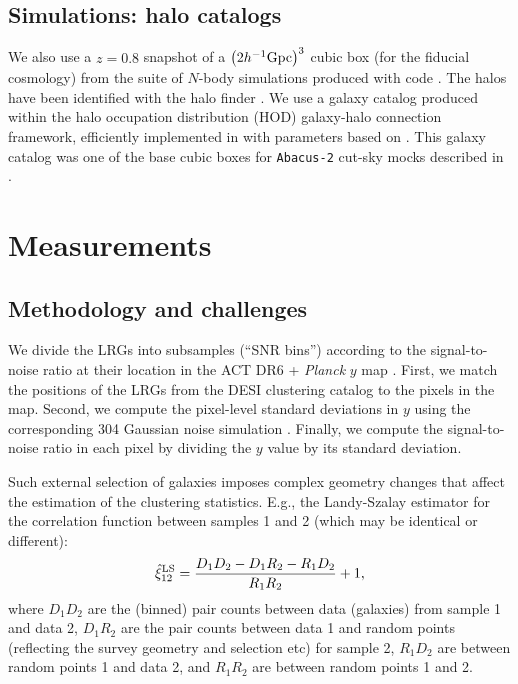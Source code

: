 \subsection{Simulations: \abacussummit{} halo catalogs}

We also use a $z=0.8$ snapshot of a $\qty(2h^{-1}{\rm Gpc})^3$ cubic box (for the fiducial cosmology) from the \abacussummit{} suite of $N$-body simulations \citep{AbacusSummit} produced with \abacus{} code \citep{Abacus-code}.
The halos have been identified with the \compaso{} halo finder \citep{CompaSO-halo-finder}.
We use a galaxy catalog produced within the halo occupation distribution (HOD) galaxy-halo connection framework, efficiently implemented in \abacushod{} \citep{AbacusHOD} with parameters based on \cite{EDR_HOD_LRGQSO2023}.
This galaxy catalog was one of the base cubic boxes for {\tt Abacus-2} cut-sky mocks described in \cite{DESI2024.III.KP4}.

\section{Measurements}
\label{sec:DESI-tSZ:measurements}

\subsection{Methodology and challenges}
\label{sec:DESI-tSZ:measurements:methodology}

We divide the LRGs into subsamples (``SNR bins'') according to the signal-to-noise ratio at their location in the ACT DR6 + {\it Planck} $y$ map \citep{ACT-maps-DR6}.
First, we match the positions of the LRGs from the DESI clustering catalog to the pixels in the map.
Second, we compute the pixel-level standard deviations in $y$ using the corresponding 304 Gaussian noise simulation \citep{ACT-noise-simulations-DR6}.
Finally, we compute the signal-to-noise ratio in each pixel by dividing the $y$ value by its standard deviation.

Such external selection of galaxies imposes complex geometry changes that affect the estimation of the clustering statistics.
E.g., the Landy-Szalay estimator \citep{Landy-Szalay} for the correlation function between samples 1 and 2 (which may be identical or different):
\begin{equation} \label{eq:2PCF-Landy-Szalay}
    \hat \xi^{\rm LS}_{12} = \frac{D_1 D_2 - D_1 R_2 - R_1 D_2}{R_1 R_2} + 1,
\end{equation}
where $D_1 D_2$ are the (binned) pair counts between data (galaxies) from sample 1 and data 2, $D_1 R_2$ are the pair counts between data 1 and random points (reflecting the survey geometry and selection etc) for sample 2, $R_1 D_2$ are between random points 1 and data 2, and $R_1 R_2$ are between random points 1 and 2.

